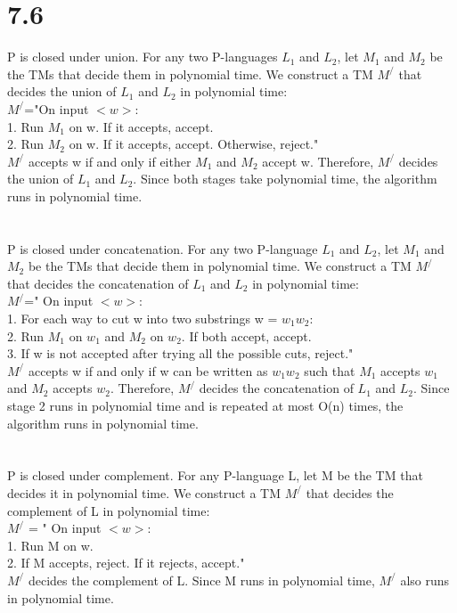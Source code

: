 \documentclass{scrartcl}
\begin{document}
\section*{7.6}
P is closed under union. For any two P-languages $L_1$ and $L_2$, let $M_1$ and $M_2$ be the TMs that decide them in polynomial time. We construct a TM $M^/$ that decides the union of $L_1$ and $L_2$ in polynomial time:\\
$M^/$="On input $<w>$:\\
1. Run $M_1$ on w. If it accepts, accept.\\
2. Run $M_2$ on w. If it accepts, accept. Otherwise, reject."\\
$M^/$ accepts w if and only if either $M_1$ and $M_2$ accept w. Therefore, $M^/$
decides the union of $L_1$ and $L_2$. Since both stages take polynomial time, the algorithm runs in polynomial time.\\
\\
\\
P is closed under concatenation. For any two P-language $L_1$ and $L_2$, let $M_1$ and $M_2$ be the TMs that decide them in polynomial time. We construct a TM $M^/$ that decides the concatenation of $L_1$ and $L_2$ in polynomial time:\\
$M^/$=" On input $<w>$:\\
1. For each way to cut w into two substrings w = $w_1w_2$:\\
2. Run $M_1$ on $w_1$ and $M_2$ on $w_2$. If both accept, accept.\\
3. If w is not accepted after trying all the possible cuts, reject."\\
$M^/$ accepts w if and only if w can be written as $w_1w_2$ such that $M_1$ accepts $w_1$ and $M_2$ accepts $w_2$. Therefore, $M^/$ decides the concatenation of $L_1$ and $L_2$. Since stage 2 runs in polynomial time and is repeated at most O(n) times, the algorithm runs in polynomial time.\\
\\
\\
P is closed under complement. For any P-language L, let M be the TM that decides it in polynomial time. We construct a TM $M^/$ that decides the complement of L in polynomial time:\\
$M^/$ = " On input $<w>$:\\
1. Run M on w.\\
2. If M accepts, reject. If it rejects, accept."\\
$M^/$ decides the complement of L. Since M runs in polynomial time, $M^/$ also runs in polynomial time.
\end{document}
